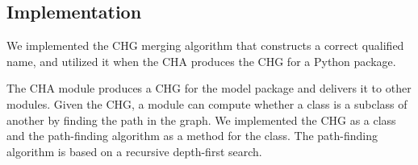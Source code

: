 \subsection{Implementation}
We implemented the CHG merging algorithm that constructs a correct
qualified name, and utilized it when the CHA produces the CHG for
a Python package. 

The CHA module produces a CHG for the model package and delivers it to
other modules. Given the CHG, a module can compute whether a class is
a subclass of another by finding the path in the graph.
We implemented the CHG as a class and the path-finding algorithm as
a method for the class. The path-finding algorithm is based on
a recursive depth-first search.


